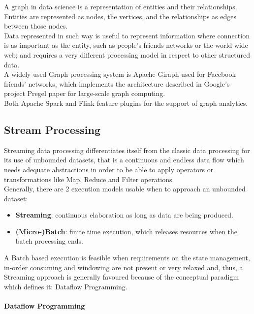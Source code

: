 A graph in data science is a representation of entities and their relationships.\newline
Entities are represented as nodes, the vertices, and the relationships as edges between those nodes.\newline
\\
Data represented in such way is useful to represent information where connection is as important as the entity, such as people's friends networks or the world wide web; and requires a very different processing model in respect to other structured data.\newline
\\
A widely used Graph processing system is Apache Giraph used for Facebook friends' networks, which implements the architecture described in Google's project Pregel paper for large-scale graph computing\cite{Malewicz:2010:PSL:1807167.1807184}.
\\
Both Apache Spark and Flink feature plugins for the support of graph analytics.

\subsection{Stream Processing} \label{StreamProc}

Streaming data processing differentiates itself from the classic data processing for its use of unbounded datasets, that is a continuous and endless data flow which needs adequate abstractions in order to be able to apply operators or transformations like Map, Reduce and Filter operations. \\ 

Generally, there are 2 execution models usable when to approach an unbounded dataset:

\begin{itemize}
    \item \textbf{Streaming}: continuous elaboration as long as data are being produced.
    \item \textbf{(Micro-)Batch}: finite time execution, which releases resources when the batch processing ends.
\end{itemize}

A Batch based execution is feasible when requirements on the state management, in-order consuming and windowing are not present or very relaxed and, thus, a Streaming approach is generally favoured because of the conceptual paradigm which defines it: Dataflow Programming.

\paragraph{Dataflow Programming}  \label{DataflowProg}

